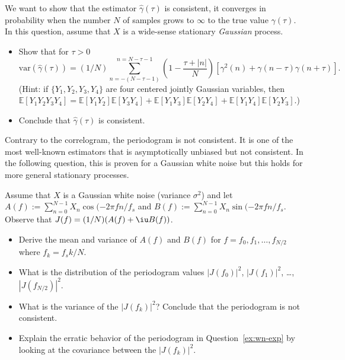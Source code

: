 \documentclass[11pt]{article}
\begin{document}
\begin{solution}
    
\end{solution}

\begin{exercise}
    We want to show that the estimator $\hat{\gamma}(\tau)$ is consistent, \ie it converges in probability when the number $N$ of samples grows to $\infty$ to the true value ${\gamma}(\tau)$.
    In this question, assume that $X$ is a wide-sense stationary \textit{Gaussian} process.
    \begin{itemize}
        \item Show that for $\tau>0$ 
    \begin{equation}
       \text{var}(\hat{\gamma}(\tau)) = (1/N) \sum_{n=-(N-\tau-1)}^{n=N-\tau-1} \left(1 - \frac{\tau + |n|}{N}\right) \left[\gamma^2(n) + \gamma(n-\tau)\gamma(n+\tau)\right].
    \end{equation}
    (Hint: if $\{Y_1, Y_2, Y_3, Y_4\}$ are four centered jointly Gaussian variables, then $\mathbb{E}[Y_1 Y_2 Y_3 Y_4] = \mathbb{E}[Y_1 Y_2]\mathbb{E}[Y_3 Y_4] + \mathbb{E}[Y_1 Y_3]\mathbb{E}[Y_2 Y_4] + \mathbb{E}[Y_1 Y_4]\mathbb{E}[Y_2 Y_3]$.) 
    \item Conclude that $\hat{\gamma}(\tau)$ is consistent.
    \end{itemize}
\end{exercise}

\begin{solution}
    
\end{solution}

Contrary to the correlogram, the periodogram is not consistent.
It is one of the most well-known estimators that is asymptotically unbiased but not consistent.
In the following question, this is proven for a Gaussian white noise but this holds for more general stationary processes.
\begin{exercise}
    Assume that $X$ is a Gaussian white noise (variance $\sigma^2$) and let $A(f):=\sum_{n=0}^{N-1} X_n \cos(-2\pi f n/f_s$ and $B(f):=\sum_{n=0}^{N-1} X_n \sin(-2\pi f n/f_s$.
    Observe that $J(f) = (1/N) (A(f) + \iu B(f))$.
    \begin{itemize}
        \item Derive the mean and variance of $A(f)$ and $B(f)$ for $f=f_0, f_1,\dots, f_{N/2}$ where $f_k=f_s k/N$.
        \item What is the distribution of the periodogram values $|J(f_0)|^2$, $|J(f_1)|^2$, \dots, $|J(f_{N/2})|^2$.
        \item What is the variance of the $|J(f_k)|^2$? Conclude that the periodogram is not consistent.
        \item Explain the erratic behavior of the periodogram in Question~\ref{ex:wn-exp} by looking at the covariance between the $|J(f_k)|^2$.
    \end{itemize}
    
\end{exercise}
\end{document}
